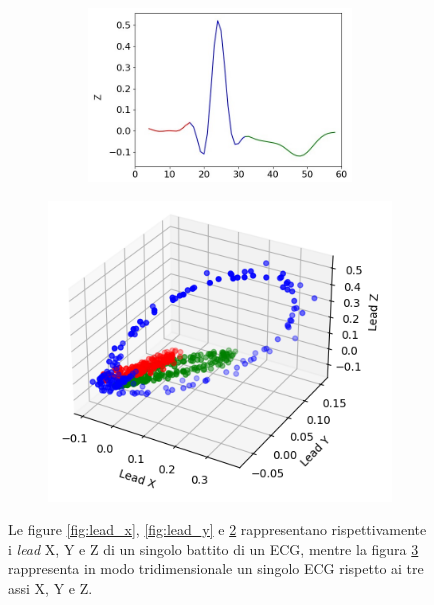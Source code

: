 \documentclass[12pt,italian]{report}
\begin{document}
\begin{figure}[H]
\begin{subfigure}{0.4\textwidth}
\begin{subfigure}{\textwidth}
            \includegraphics[width=1\textwidth]{immagini/lead_z.png}
            \caption{}
            \label{fig:lead_z}
        \end{subfigure}
    \end{subfigure}
    \begin{subfigure}{0.55\textwidth}
        \centering
        \includegraphics[width=1\linewidth]{immagini/frank3d.png}
        \captionsetup{justification=centering}
        \caption{}
        \label{fig:frank3d}
    \end{subfigure}
    \captionsetup{justification=centering}
    \caption{Le figure \ref{fig:lead_x}, \ref{fig:lead_y} e \ref{fig:lead_z} rappresentano rispettivamente i \textit{lead} X, Y e Z di un singolo battito di un ECG, mentre la figura \ref{fig:frank3d} rappresenta in modo tridimensionale un singolo ECG rispetto ai tre assi X, Y e Z.}
    \label{fig:ecg}
\end{figure}
\end{document}
